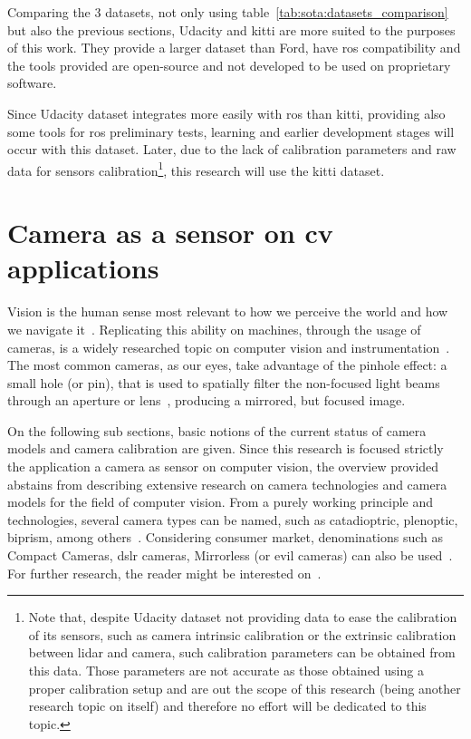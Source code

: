 Comparing the 3 datasets, not only using table~\ref{tab:sota:datasets_comparison} but also the previous sections, Udacity and \ac{kitti} are more suited to the purposes of this work. They provide a larger dataset than Ford, have \ac{ros} compatibility and the tools provided are open-source and not developed to be used on proprietary software.

Since Udacity dataset integrates more easily with \ac{ros} than \ac{kitti}, providing also some tools for \ac{ros} preliminary tests, learning and earlier development stages will occur with this dataset. Later, due to the lack of calibration parameters and raw data for sensors calibration\footnote{Note that, despite Udacity dataset not providing data to ease the calibration of its sensors, such as camera intrinsic calibration or the extrinsic calibration between \ac{lidar} and camera, such calibration parameters can be obtained from this data. Those parameters are not accurate as those obtained using a proper calibration setup and are out the scope of this research (being another research topic on itself) and therefore no effort will be dedicated to this topic.}, this research will use the \ac{kitti} dataset.



\section{Camera as a sensor on \acl{cv} applications}
\label{sec:sota:camera}
Vision is the human sense most relevant to how we perceive the world and how we navigate it~\cite{Ekstrom2015, Beck1983}. Replicating this ability on machines, through the usage of cameras, is a widely researched topic on computer vision and instrumentation~\cite{Beck1983}. The most common cameras, as our eyes, take advantage of the pinhole effect: a small hole (or pin), that is used to spatially filter the non-focused light beams through an aperture or lens~\cite{Beck1983, camera_models, Sturm2010}, producing a mirrored, but focused image.

On the following sub sections, basic notions of the current status of camera models and camera calibration are given. Since this research is focused strictly the application a camera as sensor on computer vision, the overview provided abstains from describing extensive research on camera technologies and camera models for the field of computer vision. From a purely working principle and technologies, several camera types can be named, such as catadioptric, plenoptic, biprism, among others~\cite{Sturm2010}. Considering consumer market, denominations such as Compact Cameras, \ac{dslr} cameras, Mirrorless (or \ac{evil} cameras) can also be used~\cite{comercial_cameras}. For further research, the reader might be interested on~\cite{comercial_cameras, Sturm2010, camera_models, Merklinger1993, Photopillers}.


